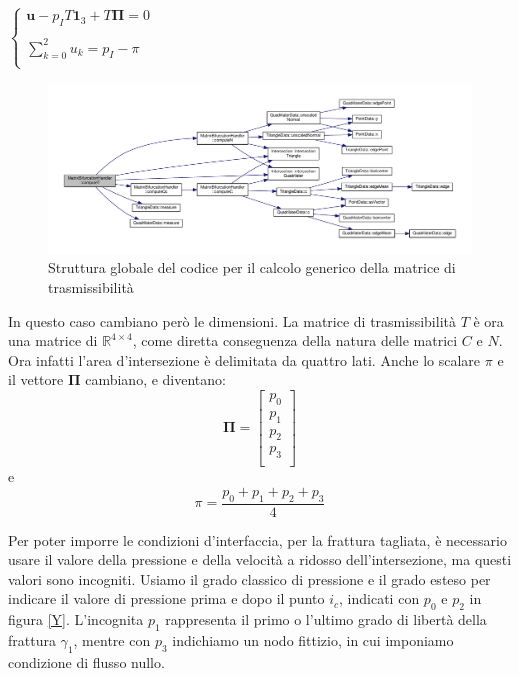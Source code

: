 \begin{center}			
	$\left \{
		\begin{array}{l}	
	 		\textbf{u} - p_{I}T\textbf{1}_{3}+T \boldsymbol{\Pi}=0  \\ \\
     	 	\displaystyle \sum_{k=0}^2 u_{k} = p_{I} - \pi  \\
		\end{array}
	\right.$
\end{center} \label{condizioni d'interfaccia y }

\begin{figure}[htbp]
\begin{center}
\includegraphics[width=1\textwidth]{img/cap6/dipendenze.pdf}
\caption{Struttura globale del codice per il calcolo generico della matrice di trasmissibilità}\label{dipendenze}
\end{center}
\end{figure}


\noindent In questo caso cambiano però le dimensioni. La matrice di trasmissibilità $T$ è ora una matrice di $\mathbb{R}^{4 \times 4}$, come diretta conseguenza della natura delle matrici $C$ e $N$. Ora infatti l'area d'intersezione è delimitata da quattro lati. Anche lo scalare $\pi$ e il vettore $\boldsymbol{\Pi}$ cambiano, e diventano:
$$\boldsymbol{\Pi} = \left[ \begin{matrix}
 			p_0\\ 
 			p_1\\
 			p_2 \\ 
		 	p_3 \\
 			\end{matrix}\right] 
$$ 
 e
$$ \pi = \frac{p_0 + p_1 + p_2 + p_3 }{4} $$

Per poter imporre le condizioni d'interfaccia, per la frattura tagliata, è necessario usare il valore della pressione e della velocità a ridosso dell'intersezione, ma questi valori sono incogniti. 
Usiamo il grado classico di pressione e il grado esteso per indicare il valore di pressione prima e dopo il punto $i_c$, indicati con $p_0$ e $p_2$ in figura \ref{Y}.  L'incognita $p_1$ rappresenta il primo o l'ultimo grado di libertà della frattura $\gamma_1$, mentre con $p_3$ indichiamo un nodo fittizio, in cui imponiamo condizione di flusso nullo.

